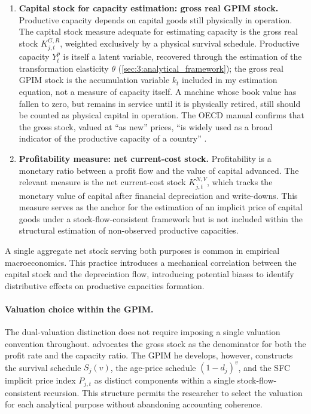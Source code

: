 \begin{enumerate}
	\item \textbf{Capital stock for capacity estimation: gross real
		GPIM stock.}
	Productive capacity depends on capital goods still physically in
	operation. The capital stock measure adequate for estimating
	capacity is the gross real stock $K^{G,R}_{j,t}$, weighted
	exclusively by a physical survival schedule. Productive capacity
	$Y^p_t$ is itself a latent variable, recovered through the
	estimation of the transformation elasticity $\theta$
	(\cref{sec:3:analytical_framework}); the gross real GPIM stock is
	the accumulation variable $k_t$ included in my estimation
	equation, not a measure of capacity itself. A machine whose book value has
	fallen to zero, but remains in service until it is physically retired, still should be counted as physical capital in operation. The OECD manual confirms that the gross stock, valued at ``as
	new'' prices, ``is widely used as a broad indicator of the
	productive capacity of a country'' \citep[p.31]{OECD2001}.
	
	\item \textbf{Profitability measure: net current-cost stock.}
	Profitability is a monetary ratio between a profit flow and the
	value of capital advanced. The relevant measure is the net
	current-cost stock $K^{N,V}_{j,t}$, which tracks the monetary
	value of capital after financial depreciation and write-downs.
	This measure serves as the anchor for the estimation of an implicit 
	price of capital goods under a stock-flow-consistent framework but is not included within the structural estimation of non-observed productive capacities. 
\end{enumerate}

A single aggregate net stock serving both purposes is common in
empirical macroeconomics. This practice introduces a mechanical
correlation between the capital stock and the depreciation flow,
introducing potential biases to identify distributive effects on productive capacities formation. 

\paragraph{Valuation choice within the GPIM.}
The dual-valuation distinction does not require imposing a single
valuation convention throughout. \citet[App.~6.3]{Shaikh2016}
advocates the gross stock as the denominator for both the profit
rate and the capacity ratio. The GPIM he develops, however,
constructs the survival schedule $S_j(v)$, the age-price schedule
$(1-d_j)^v$, and the SFC implicit price index $P_{j,t}$ as distinct
components within a single stock-flow-consistent recursion. This
structure permits the researcher to select the valuation for each
analytical purpose without abandoning accounting coherence.

